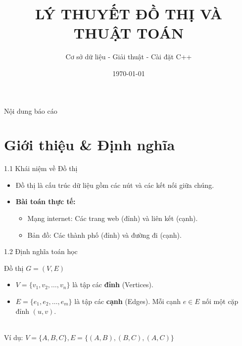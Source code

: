 \documentclass[aspectratio=169]{beamer}
\title[Lý thuyết Đồ thị & Thuật toán]{LÝ THUYẾT ĐỒ THỊ VÀ THUẬT TOÁN}
\subtitle{Cơ sở dữ liệu - Giải thuật - Cài đặt C++}
\date[\today]{\today}
\begin{document}
\begin{frame}
    \titlepage
\end{frame}

\begin{frame}{Nội dung báo cáo}
    \tableofcontents
\end{frame}

\section{Giới thiệu & Định nghĩa}
\begin{frame}{1.1 Khái niệm về Đồ thị}
    \begin{itemize}
        \item Đồ thị là cấu trúc dữ liệu gồm các nút và các kết nối giữa chúng.
        \item \textbf{Bài toán thực tế:}
        \begin{itemize}
            \item Mạng internet: Các trang web (đỉnh) và liên kết (cạnh).
            \item Bản đồ: Các thành phố (đỉnh) và đường đi (cạnh).
        \end{itemize}
    \end{itemize}
    
\end{frame}

\begin{frame}{1.2 Định nghĩa toán học}
    \begin{block}{Đồ thị $G = (V, E)$}
        \begin{itemize}
            \item $V = \{v_1, v_2, \dots, v_n\}$ là tập các \textbf{đỉnh} (Vertices).
            \item $E = \{e_1, e_2, \dots, e_m\}$ là tập các \textbf{cạnh} (Edges). Mỗi cạnh $e \in E$ nối một cặp đỉnh $(u, v)$.
        \end{itemize}
    \end{block}
    \centering
    \\ \small Ví dụ: $V = \{A, B, C\}, E = \{(A,B), (B,C), (A,C)\}$
\end{frame}
\end{document}
